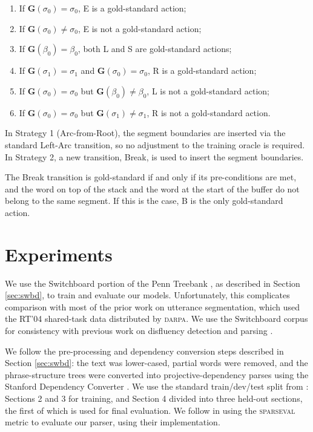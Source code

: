 \documentclass[11pt,letterpaper]{article}
\newcommand{\sparseval}{\textsc{sparseval}\xspace}
\begin{document}
\begin{enumerate}
    \item If $\mathbf{G}(\sigma_0) = \sigma_0$, E is a gold-standard action;
    \item If $\mathbf{G}(\sigma_0) \not= \sigma_0$, E is not a gold-standard action;
    \item If $\mathbf{G}(\beta_0) = \beta_0$, both L and S are gold-standard actions;
    \item If $\mathbf{G}(\sigma_1)= \sigma_1$ and $\mathbf{G}(\sigma_0) = \sigma_0$, R
        is a gold-standard action;
    \item If $\mathbf{G}(\sigma_0) = \sigma_0$ but $\mathbf{G}(\beta_0) \not= \beta_0$,
          L is not a gold-standard action;
      \item If $\mathbf{G}(\sigma_0) = \sigma_0$ but $\mathbf{G}(\sigma_1) \not= \sigma_1$,
          R is not a gold-standard action.
\end{enumerate}

\noindent In Strategy 1 (Arc-from-Root), the segment boundaries are inserted
via the standard Left-Arc transition, so no adjustment to the training oracle
is required.  In Strategy 2, a new transition, Break, is used to insert the
segment boundaries. 

The Break transition is gold-standard if and only if its pre-conditions
are met, and the word on top of the stack and the word at the start of the buffer
do not belong to the same segment.  If this is the case, B is the only gold-standard
action.

\section{Experiments}

We use the Switchboard portion of the Penn Treebank \citep{marcus:93}, as
described in Section \ref{sec:swbd}, to train and evaluate our models.  Unfortunately,
this complicates comparison with most of the prior work on utterance segmentation,
which used the RT'04 shared-task data distributed by \textsc{darpa}.  We use
the Switchboard corpus for consistency with previous work on disfluency 
detection and parsing \citep{qian:13,rasooli:13,honnibal:14}.

We follow the pre-processing and dependency conversion steps described in
Section \ref{sec:swbd}: the text was lower-cased, partial words were removed,
and the phrase-structure trees were converted into projective-dependency parses
using the Stanford Dependency Converter \citep{stanford_deps}.
We use the standard train/dev/test split from \citet{Charniak01a}: Sections 2
and 3 for training, and Section 4 divided into three held-out sections, the first
of which is used for final evaluation.
We follow \citet{honnibal:14} in using the \sparseval \citep{sparseval}
metric to evaluate our parser, using their implementation.
\end{document}
